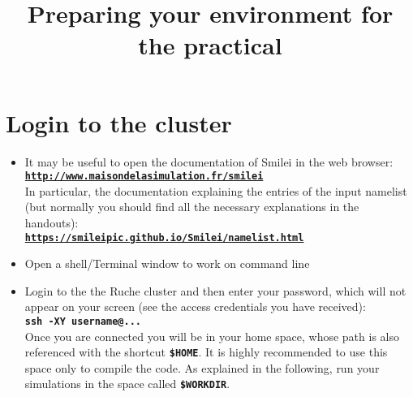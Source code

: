 \documentclass{article}
\title{\vspace{-2.cm}Preparing  your environment for the practical}
\newcommand{\smilei}{{\sc Smilei}\xspace}
\newcommand{\commandline}[1]{\texttt{\textbf{#1}}}
\begin{document}
\maketitle

\tableofcontents



\section{Login to the cluster}
\begin{itemize}

\item It may be useful to open the documentation of \smilei in the web browser:\\
 	\commandline{\url{http://www.maisondelasimulation.fr/smilei}}	\\
	In particular, the documentation explaining the entries of the input namelist (but normally you should find all the necessary explanations in the handouts):\\
\commandline{\url{https://smileipic.github.io/Smilei/namelist.html}}

\item Open a shell/Terminal window to work on command line

\item Login to the the Ruche cluster and then enter your password, which will not appear on your screen (see the access credentials you have received):\\
\commandline{ssh -XY username@...}\\

Once you are connected you will be in your home space,  whose path is also referenced with the shortcut \commandline{\$HOME}.
It is highly recommended to use this space only to compile the code. As explained in the following, run your simulations in the space called \commandline{\$WORKDIR}. 
\end{itemize}
\end{document}
